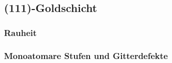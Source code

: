\subsection{(111)-Goldschicht}
\subsubsection{Rauheit}
\subsubsection{Monoatomare Stufen und Gitterdefekte}
